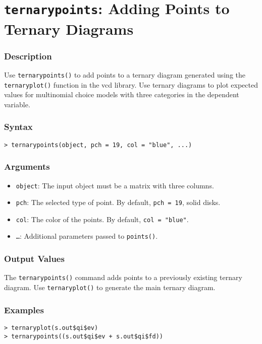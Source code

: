 \section{{\tt ternarypoints}: Adding Points to Ternary Diagrams}
\label{ternarypoints}

\subsubsection{Description}
Use {\tt ternarypoints()} to add points to a ternary diagram generated
using the {\tt ternaryplot()} function in the vcd library.  Use
ternary diagrams to plot expected values for multinomial choice models
with three categories in the dependent variable.  

\subsubsection{Syntax}
\begin{verbatim}
> ternarypoints(object, pch = 19, col = "blue", ...)
\end{verbatim}

\subsubsection{Arguments}
\begin{itemize}
\item {\tt object}: The input object must be a matrix with three
  columns.   
\item {\tt pch}: The selected type of point.  By default, {\tt pch =
    19}, solid disks.  
\item {\tt col}: The color of the points.  By default, {\tt col =
    "blue"}.  
\item {\tt \dots}: Additional parameters passed to {\tt points()}.  
\end{itemize}

\subsubsection{Output Values}
The {\tt ternarypoints()} command adds points to a previously existing
ternary diagram.  Use {\tt ternaryplot()} to generate the main ternary diagram.  

\subsubsection{Examples}
\begin{verbatim}
> ternaryplot(s.out$qi$ev)
> ternarypoints((s.out$qi$ev + s.out$qi$fd))
\end{verbatim}

